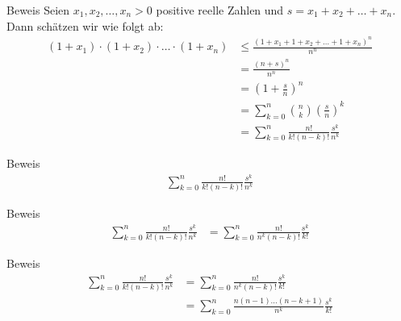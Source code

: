 \documentclass[10pt]{beamer}
\begin{document}
\begin{frame}{Beweis}
    Seien \( x_{1}, x_{2}, \ldots, x_{n} > 0 \) positive reelle Zahlen und \( s = x_{1} + x_{2} + \ldots + x_{n} \). Dann schätzen wir wie folgt ab:
    \begin{align*}
         \left( 1 + x_{1} \right) \cdot \left( 1 + x_{2} \right) \cdot \ldots \cdot \left( 1 + x_{n} \right)
         & \leq \frac{\left( 1 + x_{1} + 1 + x_{2} + \ldots + 1 + x_{n} \right)^{n}}{n^{n}} \\
         & = \frac{\left( n + s \right)^{n}}{n^{n}} \\
         & = \left( 1 + \frac{s}{n} \right)^{n} \\
         & = \sum_{k = 0}^{n} \binom{n}{k}\left( \frac{s}{n} \right)^{k} \\
         & = \sum_{k = 0}^{n} \frac{n!}{k! \left( n - k \right)!} \frac{s^{k}}{n^{k}}
    \end{align*}
\end{frame}



\begin{frame}{Beweis}
    \begin{align*}
        \sum_{k = 0}^{n} \frac{n!}{k! \left( n - k \right)!} \frac{s^{k}}{n^{k}}
    \end{align*}
\end{frame}



\begin{frame}{Beweis}
    \begin{align*}
        \sum_{k = 0}^{n} \frac{n!}{k! \left( n - k \right)!} \frac{s^{k}}{n^{k}}
        & = \sum_{k = 0}^{n} \frac{n!}{n^{k} \left( n - k \right)!} \frac{s^{k}}{k!}
    \end{align*}
\end{frame}



\begin{frame}{Beweis}
    \begin{align*}
        \sum_{k = 0}^{n} \frac{n!}{k! \left( n - k \right)!} \frac{s^{k}}{n^{k}}
        & = \sum_{k = 0}^{n} \frac{n!}{n^{k} \left( n - k \right)!} \frac{s^{k}}{k!} \\
        & = \sum_{k = 0}^{n} \frac{n \left( n - 1 \right) \ldots \left( n - k + 1 \right)}{n^{k}} \frac{s^{k}}{k!}
    \end{align*}
\end{frame}
\end{document}
